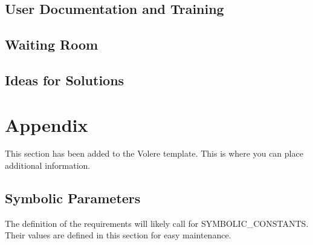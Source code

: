 \documentclass[12pt, titlepage]{article}
\begin{document}
\subsection{User Documentation and Training}

\subsection{Waiting Room}

\subsection{Ideas for Solutions}





\newpage

\section{Appendix}

This section has been added to the Volere template.  This is where you can place
additional information.

\subsection{Symbolic Parameters}

The definition of the requirements will likely call for SYMBOLIC\_CONSTANTS.
Their values are defined in this section for easy maintenance.
\end{document}
